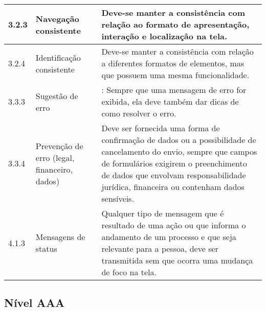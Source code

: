 \begin{appendices}
{\begin{minipage}{\linewidth}
{\begin{tabular}{|l|l|p{400px}|}
    3.2.3 &
        Navegação consistente & Deve-se manter a consistência com relação ao formato de apresentação, interação e localização na tela. \\ \hline
    3.2.4 &
        Identificação consistente & Deve-se manter a consistência com relação a diferentes formatos de elementos, mas que possuem uma mesma funcionalidade. \\ \hline
    3.3.3  &
        Sugestão de erro & : Sempre que uma mensagem de erro for exibida, ela deve também dar dicas de como resolver o erro. \\ \hline
    3.3.4  &
        Prevenção de erro (legal, financeiro, dados) & Deve ser fornecida uma forma de confirmação de dados ou a possibilidade de cancelamento do envio, sempre que campos de formulários exigirem o preenchimento de dados que envolvam responsabilidade jurídica, financeira ou contenham dados sensíveis. \\ \hline
    4.1.3  &
         Mensagens de status & Qualquer tipo de mensagem que é resultado de uma ação ou que informa o andamento de um processo e que seja relevante para a pessoa, deve ser transmitida sem que ocorra uma mudança de foco na tela. \\ \hline

\end{tabular}
}
\label{Diretrizes nível AA}

\end{minipage}

}

\subsection{Nível AAA}
{

}
\end{appendices}
